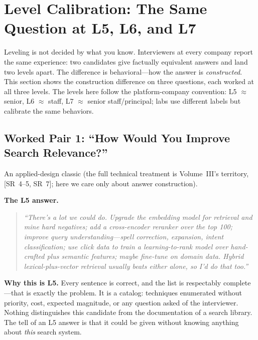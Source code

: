 \section{Level Calibration: The Same Question at L5, L6, and L7}
\label{sec:level_calibration}

Leveling is not decided by what you know. Interviewers at every company report the same experience: two candidates give factually equivalent answers and land two levels apart. The difference is behavioral---how the answer is \textit{constructed}. This section shows the construction difference on three questions, each worked at all three levels. The levels here follow the platform-company convention: L5 $\approx$ senior, L6 $\approx$ staff, L7 $\approx$ senior staff/principal; labs use different labels but calibrate the same behaviors.

\subsection{Worked Pair 1: ``How Would You Improve Search Relevance?''}

An applied-design classic (the full technical treatment is Volume~III's territory, [SR~4--5, SR~7]; here we care only about answer construction).

\textbf{The L5 answer.}
\begin{quote}\itshape
``There's a lot we could do. Upgrade the embedding model for retrieval and mine hard negatives; add a cross-encoder reranker over the top 100; improve query understanding---spell correction, expansion, intent classification; use click data to train a learning-to-rank model over hand-crafted plus semantic features; maybe fine-tune on domain data. Hybrid lexical-plus-vector retrieval usually beats either alone, so I'd do that too.''
\end{quote}

\textbf{Why this is L5.} Every sentence is correct, and the list is respectably complete---that is exactly the problem. It is a catalog: techniques enumerated without priority, cost, expected magnitude, or any question asked of the interviewer. Nothing distinguishes this candidate from the documentation of a search library. The tell of an L5 answer is that it could be given without knowing anything about \textit{this} search system.


